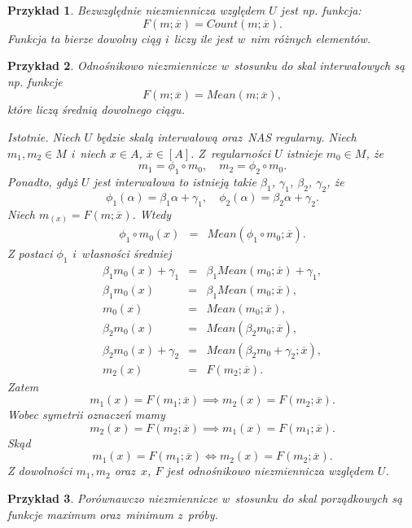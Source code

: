 \documentclass[12pt,a4paper]{report}
\newtheorem{przyklad}{Przykład}
\newcommand{\domkniecie}[1]{\left[ {#1} \right] }
\begin{document}
\begin{przyklad}
Bezwzględnie niezmiennicza względem $U$ jest np. funkcja:
$$
F(m;\overline{x})=Count(m;\overline{x}).
$$
Funkcja ta bierze dowolny ciąg i~liczy ile jest w~nim różnych elementów.
\end{przyklad}
\begin{przyklad}
Odnośnikowo niezmiennicze w~stosunku do skal interwałowych są np. funkcje
$$
F(m;\overline{x})=Mean(m;\overline{x}),
$$ 
które liczą średnią dowolnego ciągu.

Istotnie. Niech $U$ będzie skalą interwałową oraz~NAS regularny.
Niech $m_1,m_2\in M$ i~niech $x \in A $, $\overline{x}\in \domkniecie{A}$. Z~regularności $U$ istnieje $m_0 \in M$, że
$$
m_1 = \phi_1 \circ m_0, \quad m_2=\phi_2\circ m_0.
$$
Ponadto, gdyż $U$ jest interwałowa to istnieją takie $\beta_{1}$, $\gamma_{1}$, $\beta_{2}$, $\gamma_{2}$, że
$$
\phi_1(\alpha)=\beta_1 \alpha + \gamma_1, \quad \phi_2(\alpha)=\beta_2 \alpha + \gamma_2.
$$
Niech $m_(x)=F(m;\overline{x})$. Wtedy
\begin{eqnarray*}
\phi_1\circ m_0(x) & = & Mean(\phi_1\circ m_0;\overline{x}). 
\end{eqnarray*}
Z postaci $\phi_{1}$ i~własności średniej
\begin{eqnarray*}
\beta_1m_0(x)+ \gamma_1 & = & \beta_1 Mean(m_0;\overline{x}) + \gamma_1, \\
\beta_1m_0(x) & = & \beta_1 Mean(m_0;\overline{x}), \\
m_0(x) & = & Mean(m_0;\overline{x}), \\
\beta_2m_0(x) & = & Mean(\beta_2 m_0;\overline{x}), \\
\beta_2m_0(x) + \gamma_2 & = & Mean(\beta_2 m_0 + \gamma_2;\overline{x}),  \\
m_2(x) & = & F(m_2;\overline{x}) .
\end{eqnarray*}
Zatem
$$
m_1(x)=F(m_1;\overline{x}) \implies m_2(x)=F(m_2;\overline{x}).
$$
Wobec symetrii oznaczeń mamy
$$
m_2(x)=F(m_2;\overline{x}) \implies m_1(x)=F(m_1;\overline{x}).
$$
Skąd
$$
m_1(x)=F(m_1;\overline{x}) \iff m_2(x)=F(m_2;\overline{x}).
$$
Z dowolności $m_1,m_2$ oraz~$x$, $F$ jest odnośnikowo niezmiennicza względem $U$.
\end{przyklad}
\begin{przyklad}
Porównawczo niezmiennicze w~stosunku do skal porządkowych są funkcje maximum oraz~minimum z~próby.
\end{przyklad}
\end{document}
